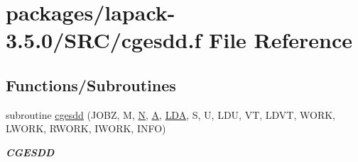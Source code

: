 \hypertarget{cgesdd_8f}{}\section{packages/lapack-\/3.5.0/\+S\+R\+C/cgesdd.f File Reference}
\label{cgesdd_8f}
\subsection*{Functions/\+Subroutines}
\begin{DoxyCompactItemize}
\item 
subroutine \hyperlink{group__complexGEsing_ga609f3fc4da34716dd2bcd985924d20bd}{cgesdd} (J\+O\+B\+Z, M, \hyperlink{polmisc_8c_a0240ac851181b84ac374872dc5434ee4}{N}, \hyperlink{classA}{A}, \hyperlink{example__user_8c_ae946da542ce0db94dced19b2ecefd1aa}{L\+D\+A}, S, U, L\+D\+U, V\+T, L\+D\+V\+T, W\+O\+R\+K, L\+W\+O\+R\+K, R\+W\+O\+R\+K, I\+W\+O\+R\+K, I\+N\+F\+O)
\begin{DoxyCompactList}\small\item\em {\bfseries C\+G\+E\+S\+D\+D} \end{DoxyCompactList}\end{DoxyCompactItemize}

